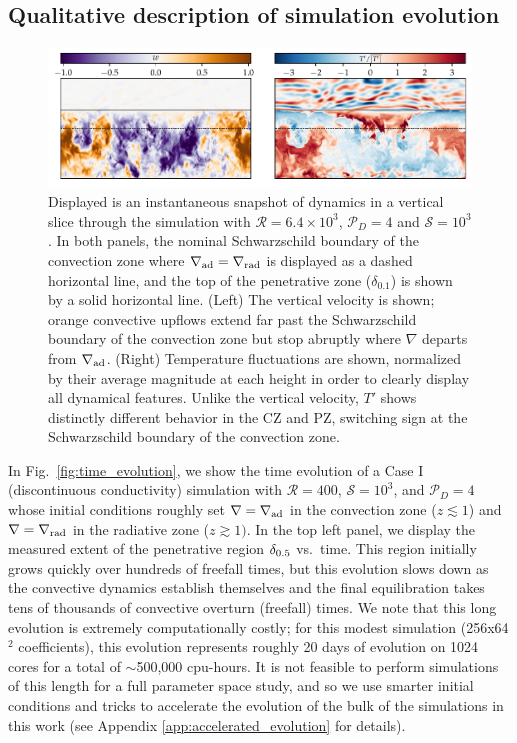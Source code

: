 \documentclass[twocolumn]{aastex631}
\newcommand{\gradrad}{\ensuremath{\nabla_{\rm{rad}}}}
\newcommand{\gradad}{\ensuremath{\nabla_{\rm{ad}}}}
\newcommand{\justgrad}{\ensuremath{\nabla}}
\newcommand{\mP}{\ensuremath{\mathcal{P}}}
\newcommand{\mR}{\ensuremath{\mathcal{R}}}
\newcommand{\mS}{\ensuremath{\mathcal{S}}}
\begin{document}
\subsection{Qualitative description of simulation evolution}
\begin{figure}[t]
\centering
\includegraphics[width=\textwidth]{vertical_dynamics_panels.pdf}
\caption{
Displayed is an instantaneous snapshot of dynamics in a vertical slice through the simulation with $\mR = 6.4 \times 10^3$, $\mP_D = 4$ and $\mS = 10^3$.
In both panels, the nominal Schwarzschild boundary of the convection zone where $\gradad = \gradrad$ is displayed as a dashed horizontal line, and the top of the penetrative zone ($\delta_{0.1}$) is shown by a solid horizontal line.
(Left) The vertical velocity is shown; orange convective upflows extend far past the Schwarzschild boundary of the convection zone but stop abruptly where $\justgrad$ departs from $\gradad$.
(Right) Temperature fluctuations are shown, normalized by their average magnitude at each height in order to clearly display all dynamical features.
Unlike the vertical velocity, $T'$ shows distinctly different behavior in the CZ and PZ, switching sign at the Schwarzschild boundary of the convection zone.
\label{fig:vertical_dynamics_panels}
}
\end{figure}

In Fig.~\ref{fig:time_evolution}, we show the time evolution of a Case I (discontinuous conductivity) simulation with $\mR = 400$, $\mS = 10^3$, and $\mP_D = 4$ whose initial conditions roughly set $\justgrad = \gradad$ in the convection zone ($z \lesssim 1$) and $\justgrad = \gradrad$ in the radiative zone ($z \gtrsim 1)$.
In the top left panel, we display the measured extent of the penetrative region $\delta_{\rm{0.5}}$ vs.~time.
This region initially grows quickly over hundreds of freefall times, but this evolution slows down as the convective dynamics establish themselves and the final equilibration takes tens of thousands of convective overturn (freefall) times.
We note that this long evolution is extremely computationally costly; for this modest simulation (256x64$^2$ coefficients), this evolution represents roughly 20 days of evolution on 1024 cores for a total of $\sim$500,000 cpu-hours.
It is not feasible to perform simulations of this length for a full parameter space study, and so we use smarter initial conditions and tricks to accelerate the evolution of the bulk of the simulations in this work (see Appendix \ref{app:accelerated_evolution} for details).
\end{document}
